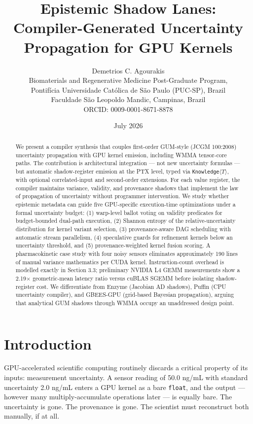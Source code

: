 \documentclass[11pt]{article}
\title{Epistemic Shadow Lanes: Compiler-Generated Uncertainty Propagation for GPU Kernels}
\author{Demetrios C. Agourakis\\
Biomaterials and Regenerative Medicine Post-Graduate Program,\\
Pontif\'{i}cia Universidade Cat\'{o}lica de S\~{a}o Paulo (PUC-SP), Brazil\\
Faculdade S\~{a}o Leopoldo Mandic, Campinas, Brazil\\
ORCID: 0009-0001-8671-8878}
\date{July 2026}
\begin{document}
\maketitle
\begin{abstract}
We present a compiler synthesis that couples first-order GUM-style (JCGM 100:2008) uncertainty propagation with GPU kernel emission, including WMMA tensor-core paths. The contribution is architectural integration --- not new uncertainty formulas --- but automatic shadow-register emission at the PTX level, typed via \texttt{Knowledge}$\langle T \rangle$, with optional correlated-input and second-order extensions. For each value register, the compiler maintains variance, validity, and provenance shadows that implement the law of propagation of uncertainty without programmer intervention. We study whether epistemic metadata can guide five GPU-specific execution-time optimizations under a formal uncertainty budget: (1) warp-level ballot voting on validity predicates for budget-bounded dual-path execution, (2) Shannon entropy of the relative-uncertainty distribution for kernel variant selection, (3) provenance-aware DAG scheduling with automatic stream parallelism, (4) speculative guards for refinement kernels below an uncertainty threshold, and (5) provenance-weighted kernel fusion scoring. A pharmacokinetic case study with four noisy sensors eliminates approximately 190 lines of manual variance mathematics per CUDA kernel. Instruction-count overhead is modelled exactly in Section 3.3; preliminary NVIDIA L4 GEMM measurements show a 2.19$\times$ geometric-mean latency ratio versus cuBLAS SGEMM before isolating shadow-register cost. We differentiate from Enzyme (Jacobian AD shadows), Puffin \cite{puffin2021} (CPU uncertainty compiler), and GBEES-GPU \cite{gbeesgpu2025} (grid-based Bayesian propagation), arguing that analytical GUM shadows through WMMA occupy an unaddressed design point.
\end{abstract}

\section{Introduction}

GPU-accelerated scientific computing routinely discards a critical property of its inputs: measurement uncertainty. A sensor reading of 50.0 ng/mL with standard uncertainty 2.0 ng/mL enters a GPU kernel as a bare \texttt{float}, and the output --- however many multiply-accumulate operations later --- is equally bare. The uncertainty is gone. The provenance is gone. The scientist must reconstruct both manually, if at all.
\end{document}
